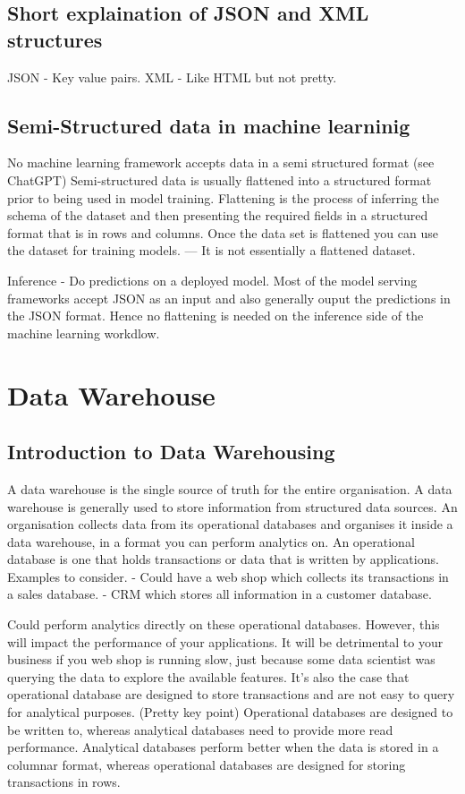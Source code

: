 \documentclass[a4paper, 11pt]{article}
\begin{document}
    \subsection{Short explaination of JSON and XML structures}
    JSON - Key value pairs.
    XML - Like HTML but not pretty.

    \subsection{Semi-Structured data in machine learninig}
    No machine learning framework accepts data in a semi structured format (see ChatGPT)
    Semi-structured data is usually flattened into a structured format prior to being used in model training.
    Flattening is the process of inferring the schema of the dataset and then presenting the required fields in a structured format that is in rows and columns.
    Once the data set is flattened you can use the dataset for training models.
    --- It is not essentially a flattened dataset.

    Inference
    - Do predictions on a deployed model.
    Most of the model serving frameworks accept JSON as an input and also generally ouput the predictions in the JSON format.
    Hence no flattening is needed on the inference side of the machine learning workdlow.


    \section{Data Warehouse}

    \subsection{Introduction to Data Warehousing}
    A data warehouse is the single source of truth for the entire organisation.
    A data warehouse is generally used to store information from structured data sources.
    An organisation collects data from its operational databases and organises it inside a data warehouse, in a format you can perform analytics on.
    An operational database is one that holds transactions or data that is written by applications.
    Examples to consider.
    - Could have a web shop which collects its transactions in a sales database.
    - CRM which stores all information in a customer database.

    Could perform analytics directly on these operational databases.
    However, this will impact the performance of your applications.
    It will be detrimental to your business if you web shop is running slow, just because some data scientist was querying the data to explore the available features.
    It's also the case that operational database are designed to store transactions and are not easy to query for analytical purposes. (Pretty key point)
    Operational databases are designed to be written to, whereas analytical databases need to provide more read performance.
    Analytical databases perform better when the data is stored in a columnar format, whereas operational databases are designed for storing transactions in rows.
\end{document}
